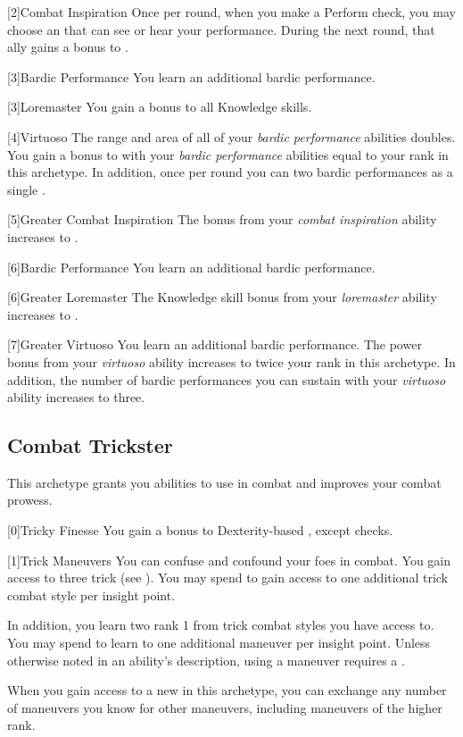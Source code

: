         [2]{Combat Inspiration} Once per round, when you make a Perform check, you may choose an  that can see or hear your performance.
        During the next round, that ally gains a  bonus to .

        [3]{Bardic Performance} You learn an additional bardic performance.

        [3]{Loremaster} You gain a  bonus to all Knowledge skills.

        [4]{Virtuoso} The range and area of all of your \textit{bardic performance} abilities doubles.
        You gain a bonus to  with your \textit{bardic performance} abilities equal to your rank in this archetype.
        In addition, once per round you can  two bardic performances as a single .

        [5]{Greater Combat Inspiration} The bonus from your \textit{combat inspiration} ability increases to .

        [6]{Bardic Performance} You learn an additional bardic performance.

        [6]{Greater Loremaster} The Knowledge skill bonus from your \textit{loremaster} ability increases to .

        [7]{Greater Virtuoso} You learn an additional bardic performance.
        The power bonus from your \textit{virtuoso} ability increases to twice your rank in this archetype.
        In addition, the number of bardic performances you can sustain with your \textit{virtuoso} ability increases to three.

    \newpage
    \subsection{Combat Trickster}
        This archetype grants you abilities to use in combat and improves your combat prowess.

        [0]{Tricky Finesse} You gain a  bonus to Dexterity-based , except  checks.

        {
            [1]{Trick Maneuvers}
            You can confuse and confound your foes in combat.
            You gain access to three trick  (see ).
            You may spend  to gain access to one additional trick combat style per insight point.

            In addition, you learn two rank 1  from trick combat styles you have access to.
            You may spend  to learn to one additional maneuver per insight point.
            Unless otherwise noted in an ability's description, using a maneuver requires a .

            When you gain access to a new  in this archetype,
                you can exchange any number of maneuvers you know for other maneuvers,
                including maneuvers of the higher rank.
        }


